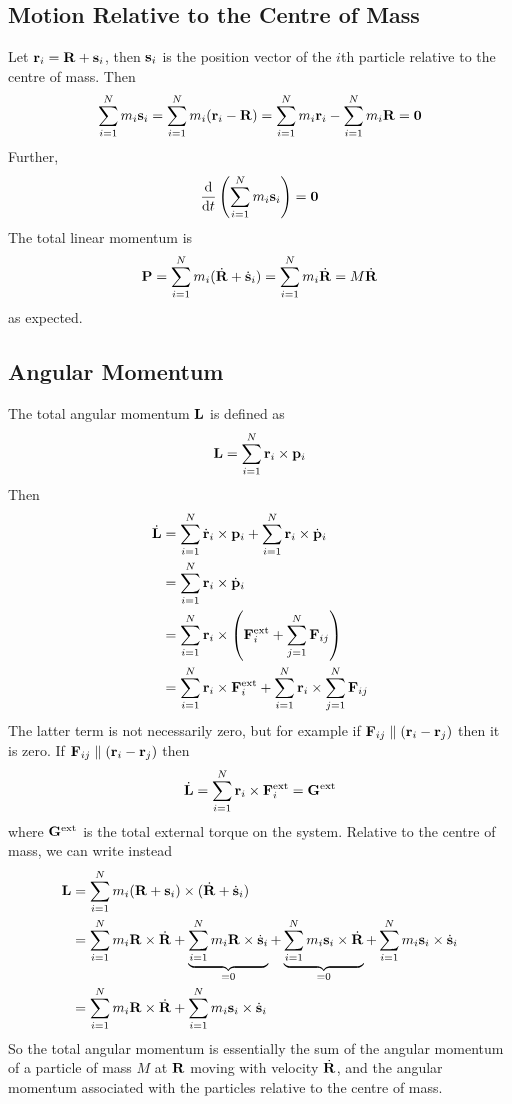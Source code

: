 \documentclass{article}
\begin{document}
\subsection{Motion Relative to the Centre of Mass}
Let $\vb r_i = \vb R + \vb s_i$, then $\vb s_i$ is the position vector of the $i$th particle relative to the centre of mass. Then
\[ \sum_{i=1}^N m_i \vb s_i = \sum_{i=1}^Nm_i (\vb r_i - \vb R) = \sum_{i=1}^N m_i \vb r_i - \sum_{i=1}^N m_i \vb R = \vb 0 \]
Further,
\[ \dv{t} \left( \sum_{i=1}^N m_i \vb s_i \right) = \vb 0 \]
The total linear momentum is
\[ \vb P = \sum_{i=1}^N m_i (\dot{\vb R} + \dot{\vb s}_i) = \sum_{i=1}^N m_i \dot{\vb R} = M\dot{\vb R} \]
as expected.

\subsection{Angular Momentum}
The total angular momentum $\vb L$ is defined as
\[ \vb L = \sum_{i=1}^N \vb r_i \times \vb p_i \]
Then
\begin{align*}
	\dot{\vb L} & = \sum_{i=1}^N \dot{\vb r}_i \times \vb p_i + \sum_{i=1}^N \vb r_i \times \dot{\vb p}_i                \\
	            & = \sum_{i=1}^N \vb r_i \times \dot{\vb p}_i                                                            \\
	            & = \sum_{i=1}^N \vb r_i \times \left( \vb F_i^\text{ext} + \sum_{j=1}^N \vb F_{ij} \right)              \\
	            & = \sum_{i=1}^N \vb r_i \times \vb F_i^\text{ext} + \sum_{i=1}^N \vb r_i \times \sum_{j=1}^N \vb F_{ij} \\
\end{align*}
The latter term is not necessarily zero, but for example if $\vb F_{ij} \parallel (\vb r_i - \vb r_j)$ then it is zero. If $\vb F_{ij} \parallel (\vb r_i - \vb r_j)$ then
\[ \dot{\vb L} = \sum_{i=1}^N \vb r_i \times \vb F_i^\text{ext} = \vb G^\text{ext} \]
where $\vb G^\text{ext}$ is the total external torque on the system. Relative to the centre of mass, we can write instead
\begin{align*}
	\vb L & = \sum_{i=1}^N m_i (\vb R + \vb s_i) \times (\dot{\vb R} + \dot{\vb s}_i)                                                                                                                                                   \\
	      & = \sum_{i=1}^N m_i \vb R \times \dot{\vb R} + \underbrace{\sum_{i=1}^N m_i \vb R \times \dot{\vb s}_i}_{=0} + \underbrace{\sum_{i=1}^N m_i \vb s_i \times \dot{\vb R}}_{=0} + \sum_{i=1}^N m_i \vb s_i \times \dot{\vb s}_i \\
	      & = \sum_{i=1}^N m_i \vb R \times \dot{\vb R} + \sum_{i=1}^N m_i \vb s_i \times \dot{\vb s}_i
\end{align*}
So the total angular momentum is essentially the sum of the angular momentum of a particle of mass $M$ at $\vb R$ moving with velocity $\dot{\vb R}$, and the angular momentum associated with the particles relative to the centre of mass.
\end{document}
